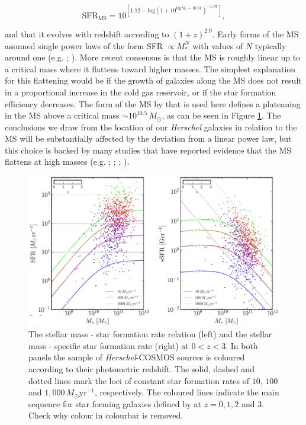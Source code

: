 \begin{equation}
	\textrm{SFR}_{\textrm{MS}} = 10^{[1.72-\textrm{log}(1+10^{\textrm{log}M_*-10.31})^{-1.07}]},
	\label{eq:scoville_ms}
\end{equation}

\noindent and that it evolves with redshift according to $(1+z)^{2.9}$. Early forms of the MS assumed single power laws of the form SFR $\propto M_*^N$ with values of $N$ typically around one (e.g. \citealt{Daddi_2007}; \citealt{Elbaz_2007}). More recent consensus is that the MS is roughly linear up to a critical mass where it flattens toward higher masses. The simplest explanation for this flattening would be if the growth of galaxies along the MS does not result in a proportional increase in the cold gas reservoir, or if the star formation efficiency decreases. The form of the MS by \citealt{Scoville_2017} that is used here defines a plateauing in the MS above a critical mass $\sim 10^{10.5}\,M_\odot$, as can be seen in Figure \ref{fig:star_formation_ms}. The conclusions we draw from the location of our \textit{Herschel} galaxies in relation to the MS will be substantially affected by the deviation from a linear power law, but this choice is backed by many studies that have reported evidence that the MS flattens at high masses (e.g. \citealt{Magnelli_2014}; \citealt{Whitaker_2014}; \citealt{Schreiber_2015}; \citealt{Tomczak_2016}).

\begin{figure}
	\centering
	\includegraphics[width=0.9\columnwidth]{Figures/star_formation_ms.pdf}
	\caption[The $M_*$-SFR plane of \textit{Herschel}-COSMOS galaxies between $0 < z < 3$]{The stellar mass - star formation rate relation (left) and the stellar mass - specific star formation rate (right) at $0 < z < 3$. In both panels the sample of \textit{Herschel}-COSMOS sources is coloured according to their photometric redshift. The solid, dashed and dotted lines mark the loci of constant star formation rates of $10$, $100$ and $1,000\,M_\odot$yr$^{-1}$, respectively. The coloured lines indicate the main sequence for star forming galaxies defined by \citealt{Scoville_2017} at $z = 0, 1, 2$ and $3$. {\color{red}Check why colour in colourbar is removed.}}
	\label{fig:star_formation_ms}
\end{figure}

